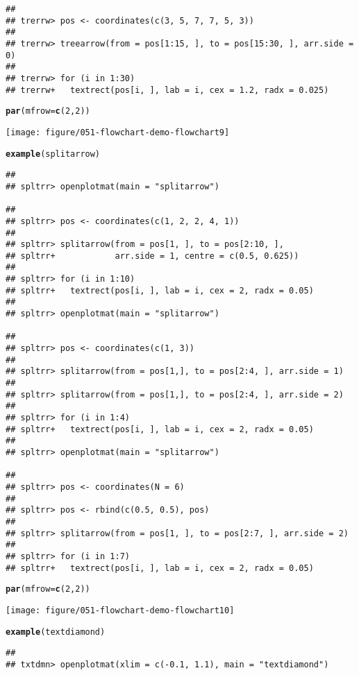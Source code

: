 \documentclass{article}\usepackage[]{graphicx}\usepackage[]{color}
\makeatletter
\def\maxwidth{ %
  \ifdim\Gin@nat@width>\linewidth
    \linewidth
  \else
    \Gin@nat@width
  \fi
}
\newcommand{\hlfunctioncall}[1]{\textcolor[rgb]{0.501960784313725,0,0.329411764705882}{\textbf{#1}}}%
\newenvironment{kframe}{%
 \def\at@end@of@kframe{}%
 \ifinner\ifhmode%
  \def\at@end@of@kframe{\end{minipage}}%
  \begin{minipage}{\columnwidth}%
 \fi\fi%
 \def\FrameCommand##1{\hskip\@totalleftmargin \hskip-\fboxsep
 \colorbox{shadecolor}{##1}\hskip-\fboxsep
     \hskip-\linewidth \hskip-\@totalleftmargin \hskip\columnwidth}%
 \MakeFramed {\advance\hsize-\width
   \@totalleftmargin\z@ \linewidth\hsize
   \@setminipage}}%
 {\par\unskip\endMakeFramed%
 \at@end@of@kframe}
\newenvironment{knitrout}{}{} %
\makeatother
\begin{document}
\begin{knitrout}
\begin{kframe}
\begin{verbatim}
## 
## trerrw> pos <- coordinates(c(3, 5, 7, 7, 5, 3))
## 
## trerrw> treearrow(from = pos[1:15, ], to = pos[15:30, ], arr.side = 0)
## 
## trerrw> for (i in 1:30) 
## trerrw+   textrect(pos[i, ], lab = i, cex = 1.2, radx = 0.025)
\end{verbatim}
\begin{alltt}
\hlfunctioncall{par}(mfrow = \hlfunctioncall{c}(2, 2))
\end{alltt}
\end{kframe}
\texttt{[image: figure/051-flowchart-demo-flowchart9]} 
\begin{kframe}\begin{alltt}
\hlfunctioncall{example}(splitarrow)
\end{alltt}
\begin{verbatim}
## 
## spltrr> openplotmat(main = "splitarrow")

## 
## spltrr> pos <- coordinates(c(1, 2, 2, 4, 1))
## 
## spltrr> splitarrow(from = pos[1, ], to = pos[2:10, ], 
## spltrr+            arr.side = 1, centre = c(0.5, 0.625))
## 
## spltrr> for (i in 1:10) 
## spltrr+   textrect(pos[i, ], lab = i, cex = 2, radx = 0.05)
## 
## spltrr> openplotmat(main = "splitarrow")

## 
## spltrr> pos <- coordinates(c(1, 3))
## 
## spltrr> splitarrow(from = pos[1,], to = pos[2:4, ], arr.side = 1)
## 
## spltrr> splitarrow(from = pos[1,], to = pos[2:4, ], arr.side = 2)
## 
## spltrr> for (i in 1:4) 
## spltrr+   textrect(pos[i, ], lab = i, cex = 2, radx = 0.05)
## 
## spltrr> openplotmat(main = "splitarrow")

## 
## spltrr> pos <- coordinates(N = 6)
## 
## spltrr> pos <- rbind(c(0.5, 0.5), pos)
## 
## spltrr> splitarrow(from = pos[1, ], to = pos[2:7, ], arr.side = 2)
## 
## spltrr> for (i in 1:7)
## spltrr+   textrect(pos[i, ], lab = i, cex = 2, radx = 0.05)
\end{verbatim}
\begin{alltt}
\hlfunctioncall{par}(mfrow = \hlfunctioncall{c}(2, 2))
\end{alltt}
\end{kframe}
\texttt{[image: figure/051-flowchart-demo-flowchart10]} 
\begin{kframe}\begin{alltt}
\hlfunctioncall{example}(textdiamond)
\end{alltt}
\begin{verbatim}
## 
## txtdmn> openplotmat(xlim = c(-0.1, 1.1), main = "textdiamond")


\end{verbatim}
\end{kframe}
\end{knitrout}
\end{document}
